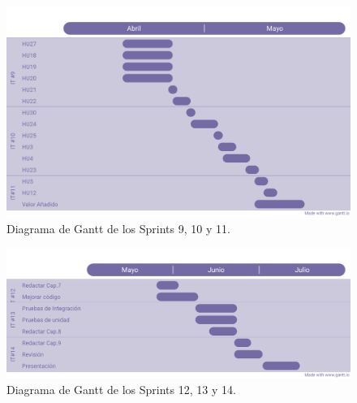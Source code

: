 \begin{figure}[H]
    \centering
    \centerline{\includegraphics[width=1.1\textwidth]{imagenes/c4/gantt3.png}}
    \caption{Diagrama de Gantt de los Sprints 9, 10 y 11.}
    \label{fig:diagrama_gantt3}
\end{figure}

\begin{figure}[H]
    \centering
    \centerline{\includegraphics[width=1.2\textwidth]{imagenes/c4/gantt4.png}}
    \caption{Diagrama de Gantt de los Sprints 12, 13 y 14.}
    \label{fig:diagrama_gantt4}
\end{figure}
